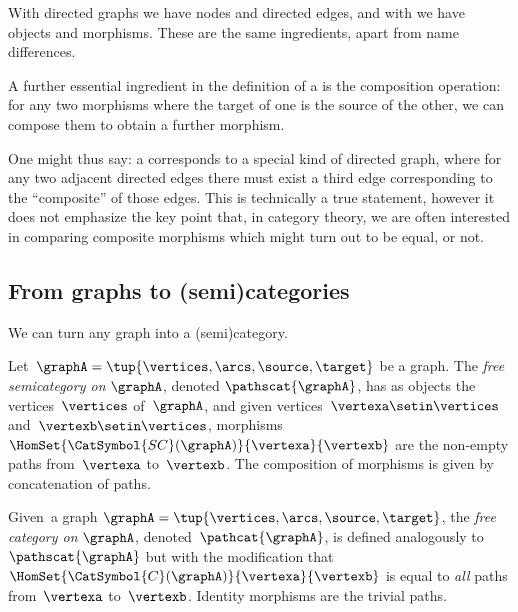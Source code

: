 With directed graphs we have nodes and directed edges, and with  we have objects and morphisms.
These are the same ingredients, apart from name differences.

A further essential ingredient in the definition of a  is the composition operation: for any two morphisms where the target of one is the source of the other, we can compose them to obtain a further morphism.

One might thus say: a  corresponds to a special kind of directed graph, where for any two adjacent directed edges there must exist a third edge corresponding to the ``composite'' of those edges.
This is technically a true statement, however it does not emphasize the key point that, in category theory, we are often interested in comparing composite morphisms which might turn out to be equal, or not.


\subsection[Categories from graphs]{From graphs to (semi)categories}
\label{sec:catsfromgraphs}

We can turn any graph into a (semi)category.

\begin{ctdefinition}
    \label{def:free-semicategory}

    Let~$\graphA=\tup{\vertices,\arcs,\source,\target}$ be a graph.
    The \emph{free semicategory on} $\graphA$, denoted $\pathscat{\graphA}$, has as objects the vertices~$\vertices$ of~$\graphA$, and given vertices~$\vertexa\setin \vertices$ and~$\vertexb\setin \vertices$, morphisms~$\HomSet{\CatSymbol{SC}(\graphA)}{\vertexa}{\vertexb}$ are the non-empty paths from~$\vertexa$ to~$\vertexb$.
    The composition of morphisms is given by concatenation of paths.
\end{ctdefinition}

\begin{ctdefinition}
    \label{def:free-category}
    Given~a graph $\graphA=\tup{\vertices,\arcs,\source,\target}$, the \emph{free category on} $\graphA$, denoted~$\pathcat{\graphA}$, is defined analogously to $\pathscat{\graphA}$ but with the modification that $\HomSet{\CatSymbol{C}(\graphA)}{\vertexa}{\vertexb}$ is equal to \emph{all} paths from~$\vertexa$ to~$\vertexb$.
    Identity morphisms are the trivial paths.
\end{ctdefinition}

